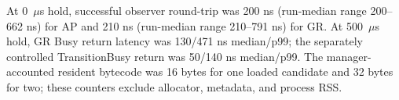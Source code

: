 At 0~$\mu$s hold, successful observer round-trip was 200 ns (run-median range 200--662 ns) for AP and 210 ns (run-median range 210--791 ns) for GR. At 500~$\mu$s hold, GR Busy return latency was 130/471 ns median/p99; the separately controlled TransitionBusy return was 50/140 ns median/p99. The manager-accounted resident bytecode was 16 bytes for one loaded candidate and 32 bytes for two; these counters exclude allocator, metadata, and process RSS.
